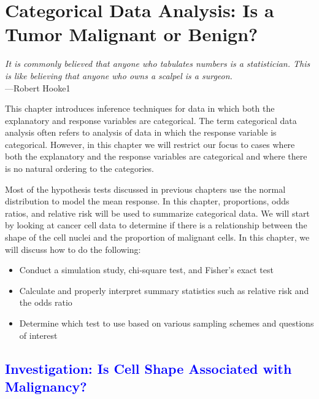 \documentclass[
]{report}
\begin{document}
\hypertarget{categorical-data-analysis-is-a-tumor-malignant-or-benign}{%
\chapter{Categorical Data Analysis: Is a Tumor Malignant or Benign?}\label{categorical-data-analysis-is-a-tumor-malignant-or-benign}}

{ \emph{It is commonly believed that anyone who tabulates numbers is a statistician. This is like believing that anyone who owns a scalpel is a surgeon.}}\\
{ ---Robert Hooke1}

This chapter introduces inference techniques for data in which both the explanatory and response variables are categorical. The term categorical data analysis often refers to analysis of data in which the response variable is categorical. However, in this chapter we will restrict our focus to cases where both the explanatory and the response variables are categorical and where there is no natural ordering to the categories.

Most of the hypothesis tests discussed in previous chapters use the normal distribution to model the mean response. In this chapter, proportions, odds ratios, and relative risk will be used to summarize categorical data. We will start by looking at cancer cell data to determine if there is a relationship between the shape of the cell nuclei and the proportion of malignant cells. In this chapter, we will discuss how to do the following:

\vspace{-1em}
\begin{itemize}
\item Conduct a simulation study, chi-square test, and Fisher’s exact test
\item Calculate and properly interpret summary statistics such as relative risk and the odds ratio
\item Determine which test to use based on various sampling schemes and questions of interest
\end{itemize}

\newpage

\hypertarget{section-48}{%
\section{\texorpdfstring{\textcolor{blue}{Investigation: Is Cell Shape Associated with Malignancy?}}{}}\label{section-48}}
\end{document}
